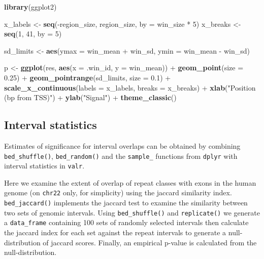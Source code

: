 \documentclass[9pt,a4paper]{extarticle}
\renewcommand{\KeywordTok}[1]{\textbf{{#1}}}
\renewcommand{\DataTypeTok}[1]{\textcolor[rgb]{0.50,0.00,0.00}{{#1}}}
\renewcommand{\DecValTok}[1]{\textcolor[rgb]{0.00,0.00,1.00}{{#1}}}
\renewcommand{\FloatTok}[1]{\textcolor[rgb]{0.50,0.00,0.50}{{#1}}}
\renewcommand{\StringTok}[1]{\textcolor[rgb]{0.87,0.00,0.00}{{#1}}}
\renewcommand{\NormalTok}[1]{{#1}}
\begin{document}
\begin{Highlighting}[]
\KeywordTok{library}\NormalTok{(ggplot2)}

\NormalTok{x_labels <-}\StringTok{ }\KeywordTok{seq}\NormalTok{(-region_size, region_size, }\DataTypeTok{by =} \NormalTok{win_size *}\StringTok{ }\DecValTok{5}\NormalTok{)}
\NormalTok{x_breaks <-}\StringTok{ }\KeywordTok{seq}\NormalTok{(}\DecValTok{1}\NormalTok{, }\DecValTok{41}\NormalTok{, }\DataTypeTok{by =} \DecValTok{5}\NormalTok{)}

\NormalTok{sd_limits <-}\StringTok{ }\KeywordTok{aes}\NormalTok{(}\DataTypeTok{ymax =} \NormalTok{win_mean +}\StringTok{ }\NormalTok{win_sd, }\DataTypeTok{ymin =} \NormalTok{win_mean -}\StringTok{ }\NormalTok{win_sd)}

\NormalTok{p <-}\StringTok{ }\KeywordTok{ggplot}\NormalTok{(res, }\KeywordTok{aes}\NormalTok{(}\DataTypeTok{x =} \NormalTok{.win_id, }\DataTypeTok{y =} \NormalTok{win_mean)) +}
\StringTok{  }\KeywordTok{geom_point}\NormalTok{(}\DataTypeTok{size =} \FloatTok{0.25}\NormalTok{) +}\StringTok{ }\KeywordTok{geom_pointrange}\NormalTok{(sd_limits, }\DataTypeTok{size =} \FloatTok{0.1}\NormalTok{) +}\StringTok{ }
\StringTok{  }\KeywordTok{scale_x_continuous}\NormalTok{(}\DataTypeTok{labels =} \NormalTok{x_labels, }\DataTypeTok{breaks =} \NormalTok{x_breaks) +}\StringTok{ }
\StringTok{  }\KeywordTok{xlab}\NormalTok{(}\StringTok{"Position (bp from TSS)"}\NormalTok{) +}\StringTok{ }\KeywordTok{ylab}\NormalTok{(}\StringTok{"Signal"}\NormalTok{) +}\StringTok{ }
\StringTok{  }\KeywordTok{theme_classic}\NormalTok{()}
\end{Highlighting}

\subsection*{Interval statistics}\label{interval-statistics}

Estimates of significance for interval overlaps can be obtained by
combining \texttt{bed\_shuffle()}, \texttt{bed\_random()} and the
\texttt{sample\_} functions from \texttt{dplyr} with interval statistics
in \texttt{valr}.

Here we examine the extent of overlap of repeat classes with exons in
the human genome (on \texttt{chr22} only, for simplicity) using the
jaccard similarity index. \texttt{bed\_jaccard()} implements the jaccard
test to examine the similarity between two sets of genomic intervals.
Using \texttt{bed\_shuffle()} and \texttt{replicate()} we generate a
\texttt{data\_frame} containing 100 sets of randomly selected intervals
then calculate the jaccard index for each set against the repeat intervals
to generate a null-distribution of jaccard scores. Finally, an empirical p-value is
calculated from the null-distribution.
\end{document}
